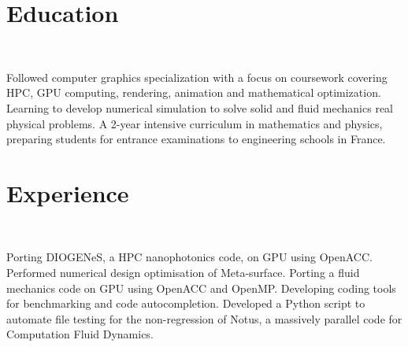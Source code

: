 \documentclass[letterpaper]{twentysecondcv} %
\begin{document}
\section{Education}
\\
\begin{twenty} %
	{Followed computer graphics specialization with a focus on coursework covering HPC, GPU computing, rendering, animation and mathematical optimization. }
	{Learning to develop numerical simulation to solve solid and fluid mechanics real physical problems.}
	{A 2-year intensive curriculum in mathematics and physics, preparing students for entrance examinations to engineering schools in France.}
\end{twenty}



\section{Experience}
\\
\begin{twenty} %
	{Porting DIOGENeS, a HPC nanophotonics code, on GPU using OpenACC.
	Performed numerical design optimisation of Meta-surface.}
	{Porting a fluid mechanics code on GPU using OpenACC and OpenMP. Developing coding tools for benchmarking and code autocompletion.}
	{Developed a Python script to automate file testing for the non-regression of Notus, a massively parallel code for Computation Fluid Dynamics.}
\end{twenty}
\end{document}
